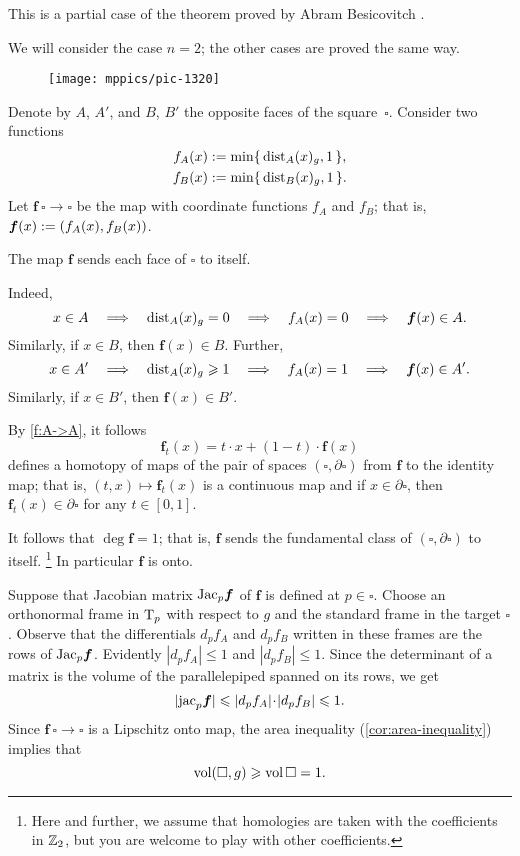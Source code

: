 This is a partial case of the theorem proved by Abram Besicovitch \cite{besicovitch}.

We will consider the case $n=2$; the other cases are proved the same way.

\begin{wrapfigure}{r}{30mm}
\vskip-0mm
\centering
\texttt{[image: mppics/pic-1320]}
\end{wrapfigure}

Denote by $A$, $A'$, and $B$, $B'$ the opposite faces of the square~$\square$.
Consider two functions
\begin{align*}
f_A(x)&\mathrel{:=}\min\{\,\mathrm{dist}_A(x)_g,1\,\},
\\
f_B(x)&\mathrel{:=}\min\{\,\mathrm{dist}_B(x)_g,1\,\}.
\end{align*}
Let $\bm{f}\:\square\to\square$ be the map with coordinate functions $f_A$ and $f_B$;
that is, $\bm{f}(x)\mathrel{:=}(f_A(x), f_B(x))$.

\begin{clm}{}\label{f:A->A}
The map $\bm{f}$ sends each face of $\square$ to itself.
\end{clm}


Indeed, 
\[x\in A \quad\Longrightarrow\quad \mathrm{dist}_A(x)_g=0 \quad\Longrightarrow\quad f_A(x)=0 \quad\Longrightarrow\quad \bm{f}(x)\in A.\]
Similarly, if $x\in B$, then $\bm{f}(x)\in B$.
Further, 
\[x\in A'
\quad\Longrightarrow\quad 
\mathrm{dist}_A(x)_g\geqslant 1 
\quad\Longrightarrow\quad 
f_A(x)=1 
\quad\Longrightarrow\quad 
\bm{f}(x)\in A'.\]
Similarly, if $x\in B'$, then $\bm{f}(x)\in B'$.

By \ref{f:A->A}, it follows 
\[\bm{f}_t(x)= t\cdot x + (1-t)\cdot \bm{f}(x)\]
defines a homotopy of maps of the pair of spaces $(\square,\partial \square)$ from $\bm{f}$ to the identity map;
that is, $(t,x)\mapsto \bm{f}_t(x)$ is a continuous map and if $x\in \partial \square$, then $\bm{f}_t(x)\in \partial \square$ for any $t\in [0,1]$.

It follows that $\deg\bm{f}=1$; that is, $\bm{f}$ sends the fundamental class of $(\square,\partial \square)$ to itself.%
\footnote{Here and further, we assume that homologies are taken with the coefficients in $\mathbb{Z}_2$, but you are welcome to play with other coefficients.}
In particular $\bm{f}$ is onto.

Suppose that Jacobian  matrix $\mathrm{Jac}_p\bm{f}$ of $\bm{f}$ is defined at $p\in \square$.
Choose an orthonormal frame in $\mathrm{T}_p$ with respect to $g$ and the standard frame in the target $\square$.
Observe that the differentials $d_pf_A$ and $d_pf_B$ written in these frames are the rows of $\mathrm{Jac}_p\bm{f}$.
Evidently $|d_pf_A|\le 1$ and $|d_pf_B|\le 1$.
Since the determinant of a matrix is the volume of the parallelepiped spanned on its rows, we get 
\[|\jac_p \bm{f}|\le |d_pf_A|\cdot|d_pf_B|\le 1.\]
Since $\bm{f}\:\square\to\square$ is a Lipschitz onto map, the area inequality (\ref{cor:area-inequality}) implies that 
\[\operatorname{\rm vol}\nolimits(\square,g)\geqslant \operatorname{\rm vol}\nolimits\square=1.\]
\qedsf

